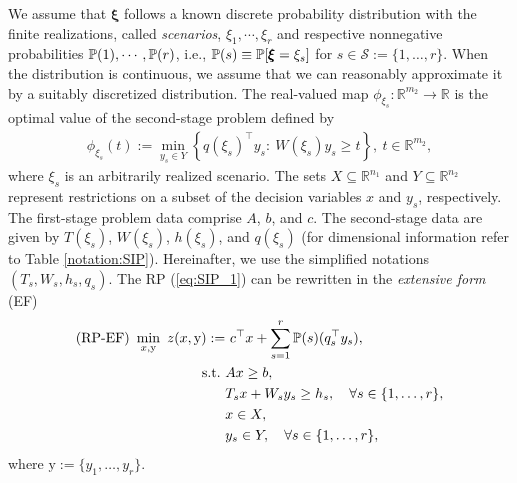 We assume that $\pmb{\xi}$ follows a known discrete probability distribution with the finite realizations, called \textit{scenarios}, $\xi_1,\cdots,\xi_r$ and respective nonnegative probabilities $\operatorname*{\mathbb{P}}(1),\cdots,\operatorname*{\mathbb{P}}(r)$, i.e., $\operatorname*{\mathbb{P}}(s)\equiv\operatorname*{\mathbb{P}}[\pmb{\xi}=\xi_s]$ for $s\in\mathcal{S}:=\{1,\ldots,r\}$. When the distribution is continuous, we assume that we can reasonably approximate it by a suitably discretized distribution. The real-valued map $\phi_{\xi_s}:\mathbb{R}^{m_2}\to\mathbb{R}$ is the optimal value of the second-stage problem defined by
\begin{align}
\phi_{\xi_s}(t):=\min_{y_s\in Y}\left\{ q(\xi_s)^\top y_s:\ W(\xi_s)y_s \ge t \right\},\ t\in\mathbb{R}^{m_2},
\end{align}
where $\xi_s$ is an arbitrarily realized scenario.
The sets $X\subseteq \mathbb{R}^{n_1}$ and $Y\subseteq\mathbb{R}^{n_2}$ represent restrictions on a subset of the decision variables $x$ and $y_s$, respectively. 
The first-stage problem data comprise $A$, $b$, and $c$. The second-stage data are given by $T(\xi_s)$, $W(\xi_s)$, $h(\xi_s)$, and $q(\xi_s)$ (for dimensional information refer to Table \ref{notation:SIP}). Hereinafter, we use the simplified notations $(T_s,W_s,h_s,q_s)$. The RP (\ref{eq:SIP_1}) can be rewritten in the \textit{extensive form} (EF)
\begin{subequations}\label{sip:ef}
\begin{align}
\textrm{(RP-EF) }\min_{x,\mathrm{y}}\ z(x,\mathrm{y}):=&\ c^{\top}x + \sum_{s=1}^{r}\operatorname*{\mathbb{P}}(s) (q_s^{\top}y_s), \label{ef:obj}\\ 
\mathrm{s.t.}\ &Ax\ge b,  \label{ef:b}\\
	&T_s x+W_s y_s\ge h_s,\quad\forall s\in\{1,\ldots,r\}, \label{ef:c} \\
	&x\in X, \label{ef:d} \\
	&y_s \in Y,\quad\forall s\in\{1,\ldots,r\}, \label{ef:e}
\end{align}
\end{subequations}
where $\mathrm{y}:=\{y_1,\ldots,y_r\}$.
